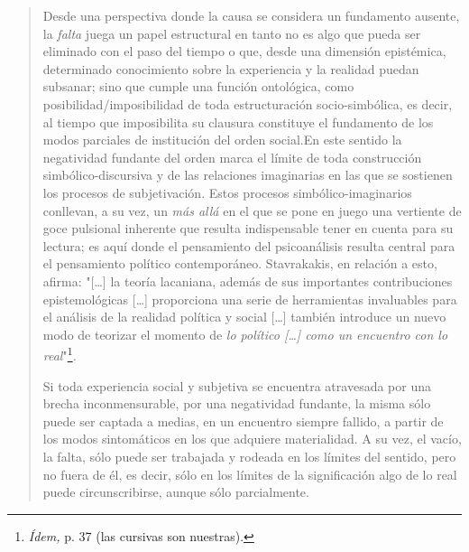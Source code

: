 \documentclass{book}
\begin{document}
\begin{quote}
Desde una perspectiva donde la causa se considera un fundamento ausente,
la \emph{falta} juega un papel estructural en tanto no es algo que pueda
ser eliminado con el paso del tiempo o que, desde una dimensión
epistémica, determinado conocimiento sobre la experiencia y la realidad
puedan subsanar; sino que cumple una función ontológica, como
posibilidad/imposibilidad de toda estructuración socio-simbólica, es
decir, al tiempo que imposibilita su clausura constituye el fundamento
de los modos parciales de institución del orden social.En este sentido
la negatividad fundante del orden marca el límite de toda construcción
simbólico-discursiva y de las relaciones imaginarias en las que se
sostienen los procesos de subjetivación. Estos procesos
simbólico-imaginarios conllevan, a su vez, un \emph{más allá} en el que
se pone en juego una vertiente de goce pulsional inherente que resulta
indispensable tener en cuenta para su lectura; es aquí donde el
pensamiento del psicoanálisis resulta central para el pensamiento
político contemporáneo. Stavrakakis, en relación a esto, afirma:
"{[}\ldots{]} la teoría lacaniana, además de sus importantes
contribuciones epistemológicas {[}\ldots{]} proporciona una serie de
herramientas invaluables para el análisis de la realidad política y
social {[}\ldots{]} también introduce un nuevo modo de teorizar el
momento de \emph{lo político {[}\ldots{]} como un encuentro con lo
real}"\footnote{\emph{Ídem,} p. 37 (las cursivas son nuestras).}\emph{.}

Si toda experiencia social y subjetiva se encuentra atravesada por una
brecha inconmensurable, por una negatividad fundante, la misma sólo
puede ser captada a medias, en un encuentro siempre fallido, a partir de
los modos sintomáticos en los que adquiere materialidad. A su vez, el
vacío, la falta, sólo puede ser trabajada y rodeada en los límites del
sentido, pero no fuera de él, es decir, sólo en los límites de la
significación algo de lo real puede circunscribirse, aunque sólo
parcialmente.


\end{quote}
\end{document}
